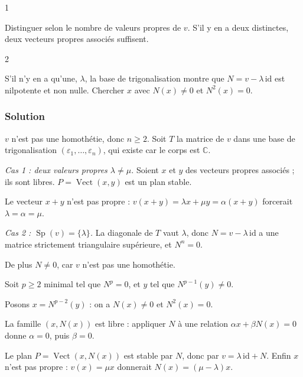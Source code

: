 \documentclass[11pt,a4paper]{article}
\begin{document}
\begin{indication}{1}

Distinguer selon le nombre de valeurs propres de \(v\). S'il y en a deux distinctes, deux vecteurs propres associés suffisent.

\end{indication}

\begin{indication}{2}

S'il n'y en a qu'une, \(\lambda\), la base de trigonalisation montre que \(N=v-\lambda\,\mathrm{id}\) est nilpotente et non nulle. Chercher \(x\) avec \(N(x)\neq0\) et \(N^2(x)=0\).

\end{indication}

\hypertarget{solution-21}{%
\subsubsection{Solution}\label{solution-21}}

\(v\) n'est pas une homothétie, donc \(n\geqslant2\). Soit \(T\) la matrice de \(v\) dans une base de trigonalisation \((\varepsilon_1,\dots,\varepsilon_n)\), qui existe car le corps est \(\mathbb C\).

\emph{Cas 1 : deux valeurs propres \(\lambda\neq\mu\).} Soient \(x\) et \(y\) des vecteurs propres associés ; ils sont libres. \(P=\operatorname{Vect}(x,y)\) est un plan stable.

Le vecteur \(x+y\) n'est pas propre : \(v(x+y)=\lambda x+\mu y=\alpha(x+y)\) forcerait \(\lambda=\alpha=\mu\).

\emph{Cas 2 : \(\operatorname{Sp}(v)=\{\lambda\}\).} La diagonale de \(T\) vaut \(\lambda\), donc \(N=v-\lambda\,\mathrm{id}\) a une matrice strictement triangulaire supérieure, et \(N^n=0\).

De plus \(N\neq0\), car \(v\) n'est pas une homothétie.

Soit \(p\geqslant2\) minimal tel que \(N^p=0\), et \(y\) tel que \(N^{p-1}(y)\neq0\).

Posons \(x=N^{p-2}(y)\) : on a \(N(x)\neq0\) et \(N^2(x)=0\).

La famille \((x,N(x))\) est libre : appliquer \(N\) à une relation \(\alpha x+\beta N(x)=0\) donne \(\alpha=0\), puis \(\beta=0\).

Le plan \(P=\operatorname{Vect}(x,N(x))\) est stable par \(N\), donc par \(v=\lambda\,\mathrm{id}+N\). Enfin \(x\) n'est pas propre : \(v(x)=\mu x\) donnerait \(N(x)=(\mu-\lambda)x\).
\end{document}

